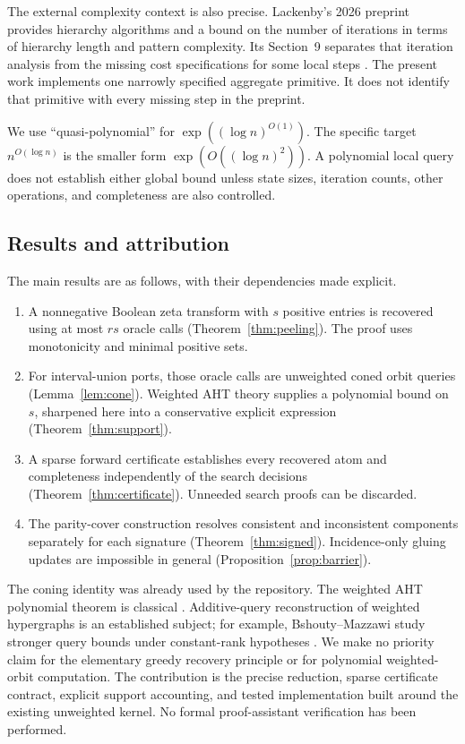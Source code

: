 \documentclass[11pt,letterpaper]{article}
\theoremstyle{definition}
\begin{document}
The external complexity context is also precise. Lackenby's 2026 preprint
provides hierarchy algorithms and a bound on the number of iterations in
terms of hierarchy length and pattern complexity. Its Section~9 separates
that iteration analysis from the missing cost specifications for some local
steps \cite{lackenby}. The present work implements one narrowly specified
aggregate primitive. It does not identify that primitive with every missing
step in the preprint.

We use ``quasi-polynomial'' for $\exp((\log n)^{O(1)})$. The specific target
$n^{O(\log n)}$ is the smaller form $\exp(O((\log n)^2))$. A polynomial local
query does not establish either global bound unless state sizes, iteration
counts, other operations, and completeness are also controlled.

\subsection{Results and attribution}
The main results are as follows, with their dependencies made explicit.
\begin{enumerate}[leftmargin=*,itemsep=0.25em]
\item A nonnegative Boolean zeta transform with $s$ positive entries is
recovered using at most $rs$ oracle calls (Theorem~\ref{thm:peeling}). The
proof uses monotonicity and minimal positive sets.
\item For interval-union ports, those oracle calls are unweighted coned
orbit queries (Lemma~\ref{lem:cone}). Weighted AHT theory supplies a
polynomial bound on $s$, sharpened here into a conservative explicit
expression (Theorem~\ref{thm:support}).
\item A sparse forward certificate establishes every recovered atom and
completeness independently of the search decisions
(Theorem~\ref{thm:certificate}). Unneeded search proofs can be discarded.
\item The parity-cover construction resolves consistent and inconsistent
components separately for each signature
(Theorem~\ref{thm:signed}). Incidence-only gluing updates are impossible in
general (Proposition~\ref{prop:barrier}).
\end{enumerate}
The coning identity was already used by the repository. The weighted AHT
polynomial theorem is classical \cite{aht}. Additive-query reconstruction of
weighted hypergraphs is an established subject; for example,
Bshouty--Mazzawi study stronger query bounds under constant-rank hypotheses
\cite{bshouty}. We make no priority claim for the elementary greedy recovery
principle or for polynomial weighted-orbit computation. The contribution is
the precise reduction, sparse certificate contract, explicit support
accounting, and tested implementation built around the existing unweighted
kernel. No formal proof-assistant verification has been performed.
\end{document}
